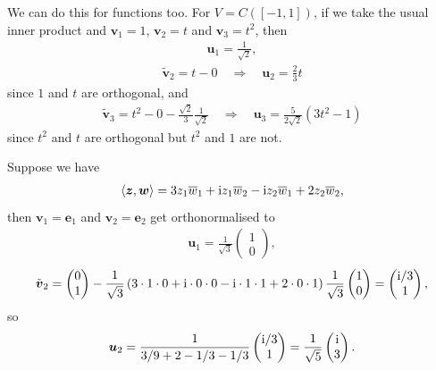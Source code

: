 \documentclass[letter-paper]{tufte-book}
\newenvironment{example}[1][Example]{\begin{trivlist}
\item[\hskip \labelsep {\bfseries #1}]}{\end{trivlist}}
\newcommand{\zi}{{\rm i}}
\newcommand{\inner}[2]{\left\langle #1, #2\right\rangle}
\newcommand{\eb}{{\boldsymbol{e}}}
\newcommand{\ub}{{\boldsymbol{u}}}
\newcommand{\vb}{{\boldsymbol{v}}}
\newcommand{\wb}{{\boldsymbol{w}}}
\newcommand{\zb}{{\boldsymbol{z}}}
\begin{document}
\begin{example}
  We can do this for functions too. For $V=C([-1, 1])$, if we take the usual inner product and $\vb_1 = 1$, $\vb_2 = t$ and $\vb_3 = t^2$, then
  \begin{align*}
    \ub_1 = \frac{1}{\sqrt{2}},
  \end{align*}
  \begin{align*}
    \tilde{\vb}_2 = t - 0 \quad \Rightarrow \quad \ub_2 = \frac{2}{3}t
  \end{align*}
  since $1$ and $t$ are orthogonal, and
  \begin{align*}
    \tilde{\vb}_3 = t^2 - 0 - \frac{\sqrt{2}}{3}\frac{1}{\sqrt{2}} \quad \Rightarrow \quad \ub_3 = \frac{5}{2\sqrt{2}}(3t^2 - 1)
  \end{align*}
  since $t^2$ and $t$ are orthogonal but $t^2$ and $1$ are not. 
\end{example}

\begin{example}
  Suppose we have
  \begin{align*}
    \inner{\zb}{\wb} = 3 z_1 \overline{w}_1 + \zi z_1 \overline{w}_2 - \zi z_2 \overline{w}_1 + 2 z_2 \overline{w}_2,
  \end{align*}
  then $\vb_1 = \eb_1$ and $\vb_2 = \eb_2$ get orthonormalised to
  \begin{align*}
    \ub_1 = \frac{1}{\sqrt{3}}\begin{pmatrix} 1 \\ 0 \end{pmatrix},
  \end{align*}
  \begin{align*}
    \tilde{\vb}_2 = \begin{pmatrix} 0 \\ 1 \end{pmatrix} - \frac{1}{\sqrt{3}}\left(3\cdot 1\cdot 0 + \zi \cdot 0 \cdot 0 - \zi \cdot 1 \cdot 1 + 2 \cdot 0  \cdot 1\right)\frac{1}{\sqrt{3}}\begin{pmatrix} 1 \\ 0 \end{pmatrix} = \begin{pmatrix} \zi / 3 \\ 1 \end{pmatrix},
  \end{align*}
  so
  \begin{align*}
    \ub_2 = \frac{1}{3/9 + 2 - 1/3 -1/3}\begin{pmatrix} \zi / 3 \\ 1 \end{pmatrix} = \frac{1}{\sqrt{5}}\begin{pmatrix} \zi \\ 3 \end{pmatrix}.
  \end{align*}
\end{example}
\end{document}
